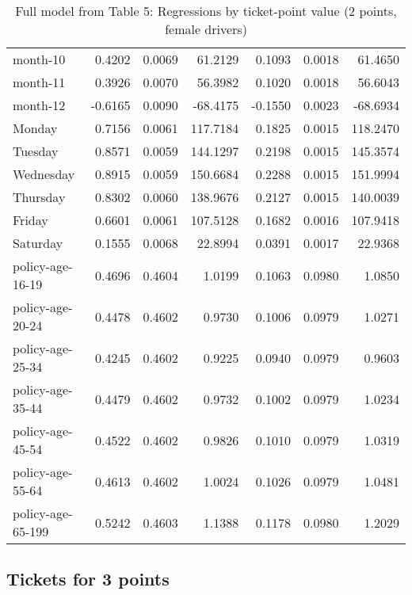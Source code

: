 \documentclass[10pt]{article}
\begin{document}
\begin{table}[ht]
\begin{tabular}{lrrrrrr}
  month-10 & 0.4202 & 0.0069 & 61.2129 & 0.1093 & 0.0018 & 61.4650 \\ 
  month-11 & 0.3926 & 0.0070 & 56.3982 & 0.1020 & 0.0018 & 56.6043 \\ 
  month-12 & -0.6165 & 0.0090 & -68.4175 & -0.1550 & 0.0023 & -68.6934 \\ 
  Monday & 0.7156 & 0.0061 & 117.7184 & 0.1825 & 0.0015 & 118.2470 \\ 
  Tuesday & 0.8571 & 0.0059 & 144.1297 & 0.2198 & 0.0015 & 145.3574 \\ 
  Wednesday & 0.8915 & 0.0059 & 150.6684 & 0.2288 & 0.0015 & 151.9994 \\ 
  Thursday & 0.8302 & 0.0060 & 138.9676 & 0.2127 & 0.0015 & 140.0039 \\ 
  Friday & 0.6601 & 0.0061 & 107.5128 & 0.1682 & 0.0016 & 107.9418 \\ 
  Saturday & 0.1555 & 0.0068 & 22.8994 & 0.0391 & 0.0017 & 22.9368 \\ 
  policy-age-16-19 & 0.4696 & 0.4604 & 1.0199 & 0.1063 & 0.0980 & 1.0850 \\ 
  policy-age-20-24 & 0.4478 & 0.4602 & 0.9730 & 0.1006 & 0.0979 & 1.0271 \\ 
  policy-age-25-34 & 0.4245 & 0.4602 & 0.9225 & 0.0940 & 0.0979 & 0.9603 \\ 
  policy-age-35-44 & 0.4479 & 0.4602 & 0.9732 & 0.1002 & 0.0979 & 1.0234 \\ 
  policy-age-45-54 & 0.4522 & 0.4602 & 0.9826 & 0.1010 & 0.0979 & 1.0319 \\ 
  policy-age-55-64 & 0.4613 & 0.4602 & 1.0024 & 0.1026 & 0.0979 & 1.0481 \\ 
  policy-age-65-199 & 0.5242 & 0.4603 & 1.1388 & 0.1178 & 0.0980 & 1.2029 \\ 
   \hline
\end{tabular}
\caption{Full model from Table 5: Regressions by ticket-point value (2 points, female drivers)} 
\label{tab_5_2_pts_F}
\end{table}


\clearpage
\pagebreak




\subsection{Tickets for 3 points}



\end{document}
